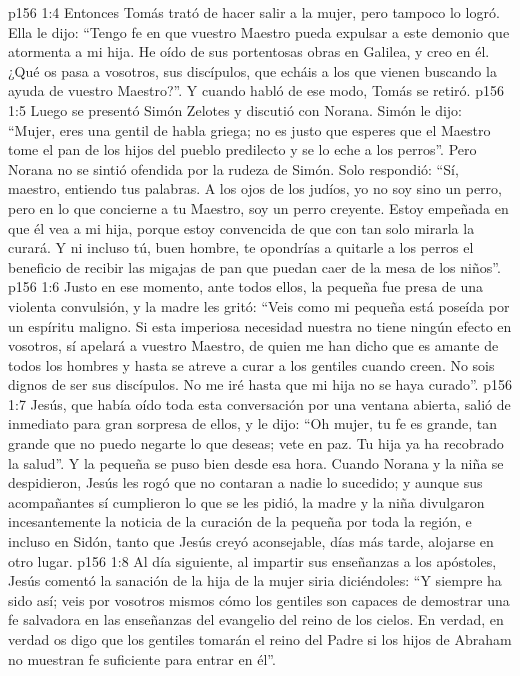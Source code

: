 \vs p156 1:4 Entonces Tomás trató de hacer salir a la mujer, pero tampoco lo logró. Ella le dijo: “Tengo fe en que vuestro Maestro pueda expulsar a este demonio que atormenta a mi hija. He oído de sus portentosas obras en Galilea, y creo en él. ¿Qué os pasa a vosotros, sus discípulos, que echáis a los que vienen buscando la ayuda de vuestro Maestro?”. Y cuando habló de ese modo, Tomás se retiró.
\vs p156 1:5 Luego se presentó Simón Zelotes y discutió con Norana. Simón le dijo: “Mujer, eres una gentil de habla griega; no es justo que esperes que el Maestro tome el pan de los hijos del pueblo predilecto y se lo eche a los perros”. Pero Norana no se sintió ofendida por la rudeza de Simón. Solo respondió: “Sí, maestro, entiendo tus palabras. A los ojos de los judíos, yo no soy sino un perro, pero en lo que concierne a tu Maestro, soy un perro creyente. Estoy empeñada en que él vea a mi hija, porque estoy convencida de que con tan solo mirarla la curará. Y ni incluso tú, buen hombre, te opondrías a quitarle a los perros el beneficio de recibir las migajas de pan que puedan caer de la mesa de los niños”.
\vs p156 1:6 Justo en ese momento, ante todos ellos, la pequeña fue presa de una violenta convulsión, y la madre les gritó: “Veis como mi pequeña está poseída por un espíritu maligno. Si esta imperiosa necesidad nuestra no tiene ningún efecto en vosotros, sí apelará a vuestro Maestro, de quien me han dicho que es amante de todos los hombres y hasta se atreve a curar a los gentiles cuando creen. No sois dignos de ser sus discípulos. No me iré hasta que mi hija no se haya curado”.
\vs p156 1:7 Jesús, que había oído toda esta conversación por una ventana abierta, salió de inmediato para gran sorpresa de ellos, y le dijo: “Oh mujer, tu fe es grande, tan grande que no puedo negarte lo que deseas; vete en paz. Tu hija ya ha recobrado la salud”. Y la pequeña se puso bien desde esa hora. Cuando Norana y la niña se despidieron, Jesús les rogó que no contaran a nadie lo sucedido; y aunque sus acompañantes sí cumplieron lo que se les pidió, la madre y la niña divulgaron incesantemente la noticia de la curación de la pequeña por toda la región, e incluso en Sidón, tanto que Jesús creyó aconsejable, días más tarde, alojarse en otro lugar.
\vs p156 1:8 \pc Al día siguiente, al impartir sus enseñanzas a los apóstoles, Jesús comentó la sanación de la hija de la mujer siria diciéndoles: “Y siempre ha sido así; veis por vosotros mismos cómo los gentiles son capaces de demostrar una fe salvadora en las enseñanzas del evangelio del reino de los cielos. En verdad, en verdad os digo que los gentiles tomarán el reino del Padre si los hijos de Abraham no muestran fe suficiente para entrar en él”.
